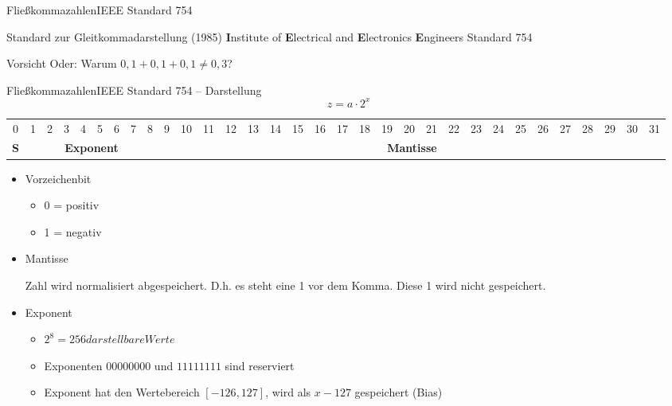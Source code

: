 \documentclass[xelatex,aspectratio=169]{beamer}
\begin{document}
\begin{frame}{Fließkommazahlen}{IEEE Standard 754}
  \begin{block}{Standard zur Gleitkommadarstellung (1985)}
    \textbf{I}nstitute of \textbf{E}lectrical and \textbf{E}lectronics \textbf{E}ngineers Standard 754
  \end{block}
  \begin{alertblock}{Vorsicht}
    \centering
    Oder: Warum \( 0,1 + 0,1 + 0,1 \neq 0,3 \)?
  \end{alertblock}
\end{frame}

\begin{frame}{Fließkommazahlen}{IEEE Standard 754 -- Darstellung}
  \setlength{\tabcolsep}{0.2em}
  \[ z = a \cdot 2^{x} \]
  \begin{tabular}{c|cccccccc|ccccccccccccccccccccccc}
    \toprule
    0                               & 1                                      & 2                                      & 3 & 4 & 5 & 6 & 7 & 8 & 9 & 10 & 11 & 12 & 13 & 14 & 15 & 16 & 17 & 18 & 19 & 20 & 21 & 22 & 23 & 24 & 25 & 26 & 27 & 28 & 29 & 30 & 31 \\
    \multicolumn{1}{c|}{\textbf{S}} & \multicolumn{8}{c|}{\textbf{Exponent}} & \multicolumn{23}{c}{\textbf{Mantisse}}                                                                                                                                           \\
    \midrule
  \end{tabular}

  \begin{itemize}
    \item Vorzeichenbit
          \begin{itemize}
            \item 0 = positiv
            \item 1 = negativ
          \end{itemize}
    \item Mantisse

          Zahl wird normalisiert abgespeichert. D.h. es steht eine 1 vor dem Komma. Diese 1 wird nicht gespeichert.
    \item Exponent
          \begin{itemize}
            \item \(2 ^ {8} = 256 darstellbare Werte\)
            \item Exponenten \( 0000 0000 \) und \( 1111 1111 \) sind reserviert
            \item Exponent hat den Wertebereich \([-126, 127]\), wird als \(x - 127\) gespeichert (Bias)
          \end{itemize}
  \end{itemize}


\end{frame}
\end{document}
